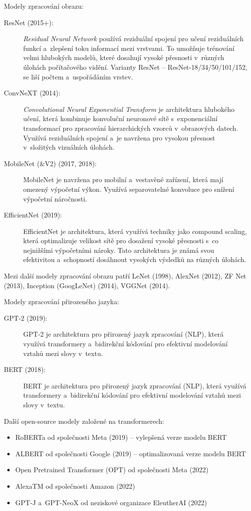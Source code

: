 Modely zpracování obrazu:
\begin{description}
    \item[ResNet (2015+):] \emph{Residual Neural Network} používá reziduální spojení pro učení reziduálních funkcí a~zlepšení toku informací mezi vrstvami. To umožňuje trénování velmi hlubokých modelů, které dosahují vysoké přesnosti v~různých úlohách počítačového vidění. Varianty ResNet -- ResNet-18/34/50/101/152, se liší počtem a~uspořádáním vrstev.

    \item[ConvNeXT (2014):] \emph{Convolutional Neural Exponential Transform} je architektura hlu\-bokého učení, která kombinuje konvoluční neuronové sítě s~exponenciální transformací pro zpracování hierarchických vzorců v~obrazových datech. Využívá reziduálních spojení a~je navržena pro vysokou přesnost v~složitých vizuálních úlohách.

    \item[MobileNet (\&V2) (2017, 2018):] MobileNet je navržena pro mobilní a~vestavěné zařízení, která mají omezený výpočetní výkon. Využívá separovatelné konvoluce pro snížení výpočetní náročnosti.

    \item[EfficientNet (2019):] EfficientNet je architektura, která využívá techniky jako compound scaling, která optimalizuje velikost sítě pro dosažení vysoké přesnosti s~co nejnižšími výpočetními nároky. Tato architektura je známá svou efektivitou a~schopností dosáhnout vysokých výsledků na různých úlohách.
\end{description}
Mezi další modely zpracování obrazu patří LeNet (1998), AlexNet (2012), ZF Net (2013), Inception (GoogLeNet) (2014), VGGNet (2014).

Modely zpracování přirozeného jazyka:
\begin{description}
    \item[GPT-2 (2019):] GPT-2 je architektura pro přirozený jazyk zpracování (NLP), která využívá transformery a~bidirekční kódování pro efektivní modelování vztahů mezi slovy v~textu.

    \item[BERT (2018):] BERT je architektura pro přirozený jazyk zpracování (NLP), která využívá transformery a~bidirekční kódování pro efektivní modelování vztahů mezi slovy v~textu.
\end{description}
Další open-source modely založené na transformerech:
\begin{itemize}
    \item RoBERTa od společnosti Meta (2019) -- vylepšená verze modelu BERT
    \item ALBERT od společnosti Google (2019) -- optimalizovaná verze modelu BERT
    \item Open Pretrained Transformer (OPT) od společnosti Meta (2022)
    \item AlexaTM od společnosti Amazon (2022)
    \item GPT-J a~GPT-NeoX od neziskové organizace EleutherAI (2022)
\end{itemize}




